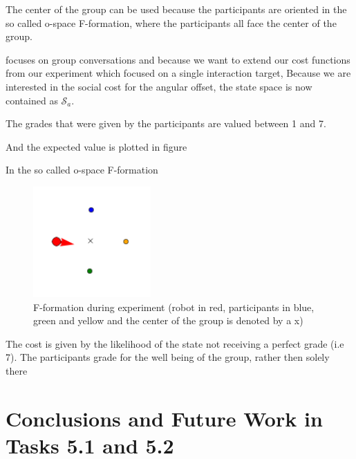 \documentclass[a4paper,11pt]{report}
\begin{document}
The center of the group can be used because the participants are oriented in the so called o-space F-formation, where the participants all face the center of the group.

focuses on group conversations and because we want to extend our cost functions from our experiment which focused on a single interaction target, 
Because we are interested in the social cost for the angular offset, the state space is now contained as $\mathcal{S}_a$.

The grades that were given by the participants are valued between 1 and 7.


And the expected value is plotted in figure


In the so called o-space F-formation
\begin{figure}
    \centering
    \includegraphics[width=0.4\textwidth]{figures/o-space_twente_data.png}
    \caption{F-formation during experiment (robot in red, participants in blue, green and yellow and the center of the group is denoted by a x)}
    	\label{fig:F-formation_experiment}
\end{figure} 

The cost is given by the likelihood of the state not receiving a perfect grade (i.e 7).
The participants grade for the well being of the group, rather then solely there  

\section{Conclusions and Future Work in Tasks 5.1 and 5.2}
\label{sec:conclusions}



\end{document}
